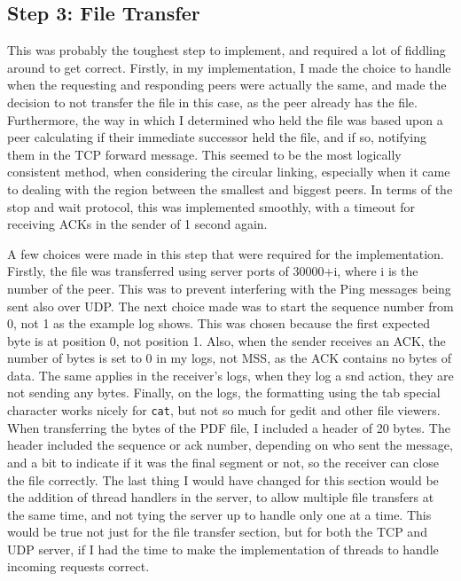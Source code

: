 \documentclass[a4paper,11pt]{article}
\newcommand{\code}{\texttt}
\begin{document}
\subsection*{Step 3: File Transfer}
This was probably the toughest step to implement, and required a lot of fiddling around to get correct. Firstly, in my implementation, I made the choice to handle when the requesting and responding peers were actually the same, and made the decision to not transfer the file in this case, as the peer already has the file. Furthermore, the way in which I determined who held the file was based upon a peer calculating if their immediate successor held the file, and if so, notifying them in the TCP forward message. This seemed to be the most logically consistent method, when considering the circular linking, especially when it came to dealing with the region between the smallest and biggest peers. In terms of the stop and wait protocol, this was implemented smoothly, with a timeout for receiving ACKs in the sender of 1 second again. 

\bigbreak

\noindent A few choices were made in this step that were required for the implementation. Firstly, the file was transferred using server ports of 30000+i, where i is the number of the peer. This was to prevent interfering with the Ping messages being sent also over UDP. The next choice made was to start the sequence number from 0, not 1 as the example log shows. This was chosen because the first expected byte is at position 0, not position 1. Also, when the sender receives an ACK, the number of bytes is set to 0 in my logs, not MSS, as the ACK contains no bytes of data. The same applies in the receiver's logs, when they log a snd action, they are not sending any bytes. Finally, on the logs, the formatting using the tab special character works nicely for \code{cat}, but not so much for gedit and other file viewers. When transferring the bytes of the PDF file, I included a header of 20 bytes. The header included the sequence or ack number, depending on who sent the message, and a bit to indicate if it was the final segment or not, so the receiver can close the file correctly. The last thing I would have changed for this section would be the addition of thread handlers in the server, to allow multiple file transfers at the same time, and not tying the server up to handle only one at a time. This would be true not just for the file transfer section, but for both the TCP and UDP server, if I had the time to make the implementation of threads to handle incoming requests correct.
\end{document}
